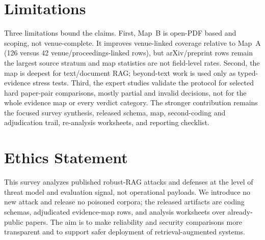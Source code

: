 \documentclass[runningheads]{llncs}
\begin{document}
\section*{Limitations}

Three limitations bound the claims. First, Map~B is open-PDF based and scoping, not venue-complete. It improves venue-linked coverage relative to Map~A (126 versus 42 venue/proceedings-linked rows), but arXiv/preprint rows remain the largest source stratum and map statistics are not field-level rates. Second, the map is deepest for text/document RAG; beyond-text work is used only as typed-evidence stress tests. Third, the expert studies validate the protocol for selected hard paper-pair comparisons, mostly partial and invalid decisions, not for the whole evidence map or every verdict category. The stronger contribution remains the focused survey synthesis, released schema, map, second-coding and adjudication trail, re-analysis worksheets, and reporting checklist.

\section*{Ethics Statement}

This survey analyzes published robust-RAG attacks and defenses at the level of threat model and evaluation signal, not operational payloads. We introduce no new attack and release no poisoned corpora; the released artifacts are coding schemas, adjudicated evidence-map rows, and analysis worksheets over already-public papers. The aim is to make reliability and security comparisons more transparent and to support safer deployment of retrieval-augmented systems.



\end{document}
